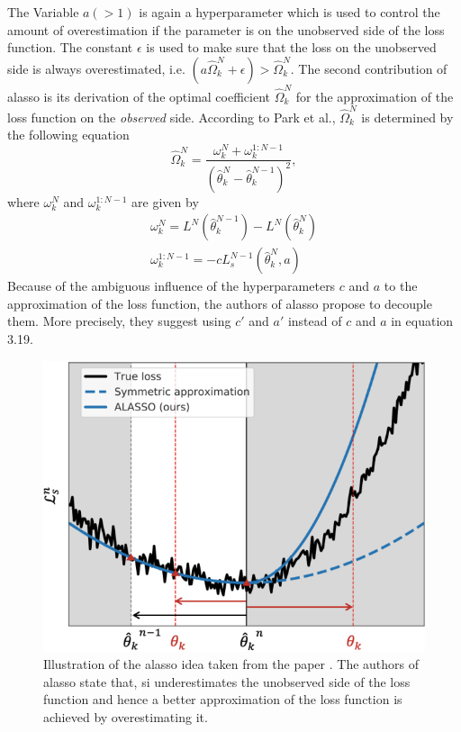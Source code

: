 The Variable $a (>1)$ is again a hyperparameter which is used to control the amount of overestimation if the parameter is on the unobserved side of the loss function.
The constant $\epsilon$ is used to make sure that the loss on the unobserved side is always overestimated, i.e. $(a \hat{\Omega}^N_k + \epsilon) > \hat{\Omega}^N_k$.
The second contribution of \gls{alasso} is its derivation of the optimal coefficient $\hat{\Omega}^N_k$ for the approximation of the loss function on the \textit{observed}
side. According to Park et al., $\hat{\Omega}^N_k$ is determined by the following equation
\begin{equation} \label{eq:ALASSO_Omega}
    \hat{\Omega}^N_k = \frac{\omega^N_k + \omega^{1:N-1}_k}{(\hat{\theta}^N_k - \hat{\theta}^{N-1}_k)^2},
\end{equation}
where $\omega^N_k$ and $\omega^{1:N-1}_k$ are given by
\begin{gather} \label{eq:ALASSO_Small_Omega}
    \omega^N_k = L^N(\hat{\theta}^{N-1}_k) - L^N(\hat{\theta}^N_k) \\
    \omega^{1:N-1}_k = -cL^{N-1}_s(\hat{\theta}^N_k,a)
\end{gather}
Because of the ambiguous influence of the hyperparameters $c$ and $a$ to the approximation of the loss function, the authors of \gls{alasso} propose to decouple them. More
precisely, they suggest using $c'$ and $a'$ instead of $c$ and $a$ in equation 3.19.

\begin{figure} [ht]
    \centering
    \includegraphics[width=.7\linewidth]{images/Alasso_Idea.png}
    \caption[Visualization of ALASSO]{Illustration of the \gls{alasso} idea taken from the paper \cite{park2019continual}. The authors of \gls{alasso} state that, \gls{si}
    underestimates the unobserved side of the loss function and hence a better approximation of the loss function is achieved by overestimating it.}
    \label{fig:Alasso}
\end{figure}

